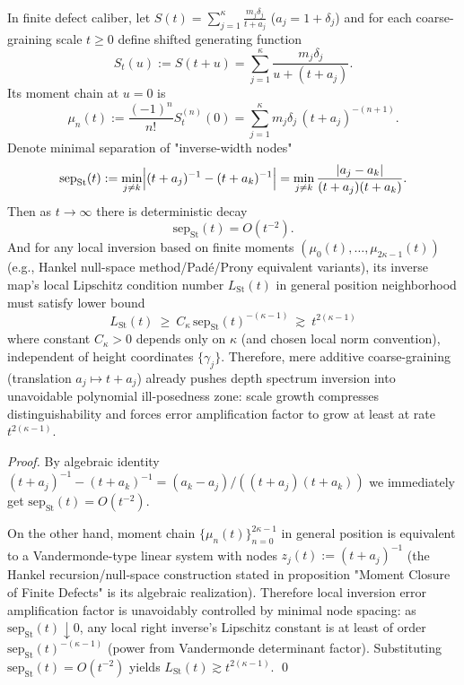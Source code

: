 \begin{proposition}\label{prop:xi-stieltjes-coarsegraining-illposedness-polynomial}
In finite defect caliber, let \(S(t)=\sum_{j=1}^{\kappa}\frac{m_j\delta_j}{t+a_j}\) (\(a_j=1+\delta_j\)) and for each coarse-graining scale \(t\ge 0\) define shifted generating function
\[
S_t(u):=S(t+u)=\sum_{j=1}^{\kappa}\frac{m_j\delta_j}{u+(t+a_j)}.
\]
Its moment chain at \(u=0\) is
\[
\mu_n(t):=\frac{(-1)^n}{n!}S_t^{(n)}(0)=\sum_{j=1}^{\kappa}m_j\delta_j\,(t+a_j)^{-(n+1)}.
\]
Denote minimal separation of "inverse-width nodes"
\[
\mathrm{sep}_{\mathrm{St}}(t)
:=\min_{j\ne k}\Bigl|(t+a_j)^{-1}-(t+a_k)^{-1}\Bigr|
=\min_{j\ne k}\frac{|a_j-a_k|}{(t+a_j)(t+a_k)}.
\]
Then as \(t\to\infty\) there is deterministic decay
\[
\mathrm{sep}_{\mathrm{St}}(t)=O(t^{-2}).
\]
And for any local inversion based on finite moments \((\mu_0(t),\dots,\mu_{2\kappa-1}(t))\) (e.g., Hankel null-space method/Padé/Prony equivalent variants), its inverse map's local Lipschitz condition number \(L_{\mathrm{St}}(t)\) in general position neighborhood must satisfy lower bound
\[
\boxed{\;
L_{\mathrm{St}}(t)\ \ge\ C_\kappa\,\mathrm{sep}_{\mathrm{St}}(t)^{-(\kappa-1)}\ \gtrsim\ t^{2(\kappa-1)}\;}
\]
where constant \(C_\kappa>0\) depends only on \(\kappa\) (and chosen local norm convention), independent of height coordinates \(\{\gamma_j\}\).
Therefore, mere additive coarse-graining (translation \(a_j\mapsto t+a_j\)) already pushes depth spectrum inversion into unavoidable polynomial ill-posedness zone: scale growth compresses distinguishability and forces error amplification factor to grow at least at rate \(t^{2(\kappa-1)}\).
\end{proposition}
\begin{proof}
By algebraic identity
\(
(t+a_j)^{-1}-(t+a_k)^{-1}=(a_k-a_j)/((t+a_j)(t+a_k))
\)
we immediately get \(\mathrm{sep}_{\mathrm{St}}(t)=O(t^{-2})\).
\par
On the other hand, moment chain \(\{\mu_n(t)\}_{n=0}^{2\kappa-1}\) in general position is equivalent to a Vandermonde-type linear system with nodes
\(
z_j(t):=(t+a_j)^{-1}
\)
(the Hankel recursion/null-space construction stated in proposition "Moment Closure of Finite Defects" is its algebraic realization).
Therefore local inversion error amplification factor is unavoidably controlled by minimal node spacing: as \(\mathrm{sep}_{\mathrm{St}}(t)\downarrow 0\), any local right inverse's Lipschitz constant is at least of order \(\mathrm{sep}_{\mathrm{St}}(t)^{-(\kappa-1)}\) (power from Vandermonde determinant factor).
Substituting \(\mathrm{sep}_{\mathrm{St}}(t)=O(t^{-2})\) yields \(L_{\mathrm{St}}(t)\gtrsim t^{2(\kappa-1)}\). \qed
\end{proof}

